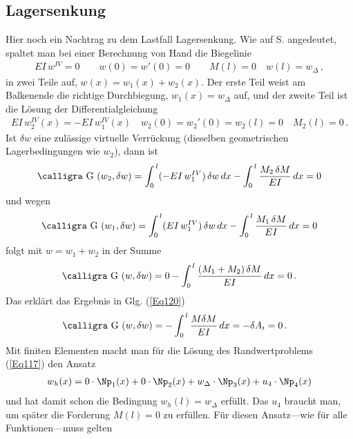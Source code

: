 {{{{{{{{{%
\textcolor{blau2}{\subsection{Lagersenkung}}\label{Lagersenkung}
Hier noch ein Nachtrag zu dem Lastfall Lagersenkung. Wie auf S. \pageref{Eq36} angedeutet, spaltet man bei einer Berechnung von Hand die Biegelinie
\begin{align}\label{Eq116}
EI\,w^{IV} = 0 \qquad w(0) = w'(0) = 0 \qquad M(l) = 0\quad w(l) = w_{\Delta}\,,
\end{align}
in zwei Teile auf, $w(x) = w_1(x) + w_2(x)$. Der erste Teil weist am Balkenende die richtige Durchbiegung, $w_1(x) = w_\Delta $ auf, und der zweite Teil ist die L\"{o}sung der Differentialgleichung
\begin{align} \label{Eq117}
EI\,w_2^{IV}(x)= - EI\,w_1^{IV}(x) \quad w_2(0) = w_2'(0) = w_2(l) = 0 \quad M_2(l) = 0\,.
\end{align}
Ist $\delta w$ eine zul\"{a}ssige virtuelle Verr\"{u}ckung (dieselben geometrischen Lagerbedingungen wie $w_2$), dann ist
\begin{align}
\text{\normalfont\calligra G\,\,}(w_2,\delta w) = \int_0^{\,l} (- EI\,w_1^{IV})\,\delta w\,dx - \int_0^{\,l} \frac{M_2\,\delta M}{EI}\,dx = 0
\end{align}
und wegen
\begin{align}
\text{\normalfont\calligra G\,\,}(w_1,\delta w) = \int_0^{\,l} ( EI\,w_1^{IV})\,\delta w\,dx - \int_0^{\,l} \frac{M_1\,\delta M}{EI}\,dx = 0
\end{align}
folgt mit $w = w_1 + w_2$ in der Summe
\begin{align}
\text{\normalfont\calligra G\,\,}(w,\delta w) = 0 - \int_0^{\,l} \frac{(M_1 + M_2)\,\delta M}{EI}\,dx = 0\,.
\end{align}
Das erkl\"{a}rt das Ergebnis in Glg. (\ref{Eq120})
\begin{align}
\text{\normalfont\calligra G\,\,}(w,\delta w) &= -\int_0^{\,l} \frac{M \delta M}{EI}\,dx =  -\delta A_i = 0\,.
\end{align}
Mit finiten Elementen macht man f\"{u}r die L\"{o}sung des Randwertproblems (\ref{Eq117}) den Ansatz
\begin{align}
w_h(x) = 0 \cdot \Np_1(x) + 0 \cdot \Np_2(x) + w_\Delta \cdot \Np_3(x) + u_4 \cdot \Np_4(x)
\end{align}
und hat damit schon die Bedingung $w_h(l) = w_\Delta$ erf\"{u}llt. Das $u_4$ braucht man, um sp\"{a}ter die Forderung $M(l) = 0 $ zu erf\"{u}llen. F\"{u}r diesen Ansatz---wie f\"{u}r alle Funktionen---muss gelten
}}}}}}}}}
